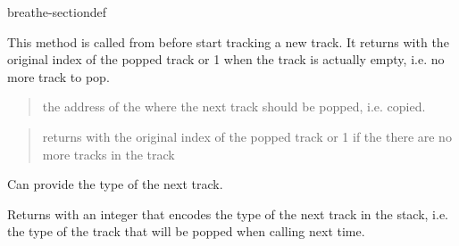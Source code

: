 \documentclass[letterpaper,10pt,english]{sphinxmanual}
\begin{document}
\begin{fulllineitems}
\begin{sphinxuseclass}{breathe-sectiondef}
\begin{fulllineitems}
\sphinxAtStartPar
This method is called from  before start tracking a new track. It returns with the original index of the popped track or \sphinxhyphen{}1 when the track is actually empty, i.e. no more track to pop.

\sphinxAtStartPar
\begin{quote}\begin{description}
\sphinxAtStartPar
\sphinxstylestrong{{[}inout{]}} the address of the  where the next track should be popped, i.e. copied. 

\end{description}\end{quote}
\begin{quote}\begin{description}
\sphinxAtStartPar
returns with the original index of the popped track or \sphinxhyphen{}1 if the there are no more tracks in the track 

\end{description}\end{quote}


\end{fulllineitems}


\begin{fulllineitems}
\label{\detokenize{Simulation/SimulationCodeDoc:_CPPv4N10TrackStack18GetTypeOfNextTrackEv}}
\pysigstartsignatures
\pysigstartmultiline
{}
\pysigstopmultiline
\pysigstopsignatures
\sphinxAtStartPar
Can provide the type of the next track. 

\sphinxAtStartPar
Returns with an integer that encodes the type of the next track in the stack, i.e. the type of the track that will be popped when calling  next time.


\end{fulllineitems}
\end{sphinxuseclass}
\end{fulllineitems}
\end{document}

